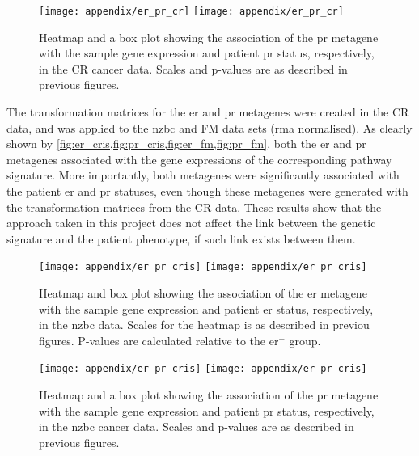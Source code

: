 \begin{appendices}
	\begin{figure}[htp!]
		\centering
		\texttt{[image: appendix/er\_pr\_cr]}
		\hfill
		\texttt{[image: appendix/er\_pr\_cr]}\\
		\caption[\acrshort{pr} metagene in the CR data]{Heatmap and a box plot showing the association of the \gls{pr} metagene with the sample gene expression and patient \gls{pr} status, respectively, in the CR cancer data.
		Scales and  p-values are as described in previous figures.}
		\label{fig:pr_cr}
	\end{figure}

The transformation matrices for the \gls{er} and \gls{pr} metagenes were created in the CR data, and was applied to the \gls{nzbc} and FM data sets (\gls{rma} normalised).
As clearly shown by \cref{fig:er_cris,fig:pr_cris,fig:er_fm,fig:pr_fm}, both the \gls{er} and \gls{pr} metagenes associated with the gene expressions of the corresponding pathway signature.
More importantly, both metagenes were significantly associated with the patient \gls{er} and \gls{pr} statuses, even though these metagenes were generated with the transformation matrices from the CR data.
These results show that the approach taken in this project does not affect the link between the genetic signature and the patient phenotype, if such link exists between them.

	\begin{figure}[htp!]
		\centering
		\texttt{[image: appendix/er\_pr\_cris]}
		\hfill
		\texttt{[image: appendix/er\_pr\_cris]}\\
		\caption[\acrshort{er} metagene in the \gls{nzbc} data]{Heatmap and box plot showing the association of the \gls{er} metagene with the sample gene expression and patient \gls{er} status, respectively, in the \gls{nzbc} data.
		Scales for the heatmap is as described in previou figures.
		P-values  are calculated relative to the \gls{er}$^-$ group.}
		\label{fig:er_cris}
	\end{figure}

	\begin{figure}[htp!]
		\centering
		\texttt{[image: appendix/er\_pr\_cris]}
		\hfill
		\texttt{[image: appendix/er\_pr\_cris]}\\
		\caption[\acrshort{pr} metagene in the \gls{nzbc} data]{Heatmap and a box plot showing the association of the \gls{pr} metagene with the sample gene expression and patient \gls{pr} status, respectively, in the \gls{nzbc} cancer data.
		Scales and  p-values are as described in previous figures.}
		\label{fig:pr_cris}
	\end{figure}


\end{appendices}

